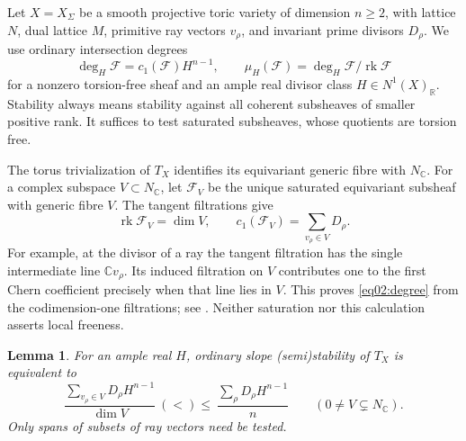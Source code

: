 \documentclass[11pt]{amsart}
\newtheorem{lemma}[theorem]{Lemma}
\theoremstyle{definition}
\theoremstyle{remark}
\newcommand{\RR}{\mathbb R}
\newcommand{\CC}{\mathbb C}
\newcommand{\rk}{\operatorname{rk}}
\begin{document}
Let \(X=X_\Sigma\) be a smooth projective toric variety of dimension
\(n\ge2\), with lattice \(N\), dual lattice \(M\), primitive ray
vectors \(v_\rho\), and invariant prime divisors \(D_\rho\).
We use ordinary intersection degrees
\[
 \deg_H\mathcal F=c_1(\mathcal F)H^{n-1},\qquad
 \mu_H(\mathcal F)=\deg_H\mathcal F/\rk\mathcal F
\]
for a nonzero torsion-free sheaf and an ample real divisor class
\(H\in N^1(X)_\RR\). Stability always means stability against all
coherent subsheaves of smaller positive rank. It suffices to test
saturated subsheaves, whose quotients are torsion free.

The torus trivialization of \(T_X\) identifies its equivariant generic
fibre with \(N_\CC\). For a complex subspace \(V\subset N_\CC\),
let \(\mathcal F_V\) be the unique saturated equivariant subsheaf
with generic fibre \(V\). The tangent filtrations give
\begin{equation}\label{eq02:degree}
 \rk\mathcal F_V=\dim V,\qquad
 c_1(\mathcal F_V)=\sum_{v_\rho\in V}D_\rho.
\end{equation}
For example, at the divisor of a ray the tangent filtration has the
single intermediate line \(\CC v_\rho\). Its induced filtration on
\(V\) contributes one to the first Chern coefficient precisely when
that line lies in \(V\). This proves \eqref{eq02:degree} from the
codimension-one filtrations; see
\cite[\S2]{heringnillsuess2022}\cite[Theorem~2.1.8]{pang2015}.
Neither saturation nor this calculation asserts local freeness.

\begin{lemma}\label{lem02:realtest}
For an ample real \(H\), ordinary slope (semi)stability of \(T_X\)
is equivalent to
\begin{equation}\label{eq02:test}
 \frac{\sum_{v_\rho\in V}D_\rho H^{n-1}}{\dim V}
 \ \mathrel{(<)}\le\ \frac{\sum_\rho D_\rho H^{n-1}}n
 \qquad(0\ne V\subsetneq N_\CC).
\end{equation}
Only spans of subsets of ray vectors need be tested.
\end{lemma}
\end{document}
